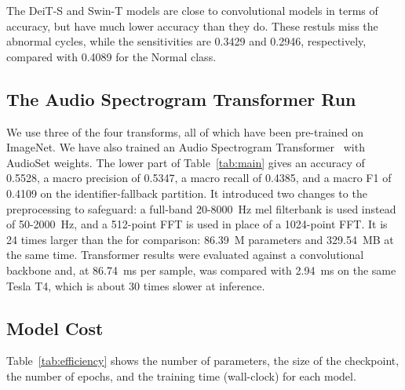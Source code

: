 \documentclass[journal,onecolumn]{IEEEtran}
\begin{document}
The DeiT-S and Swin-T models are close to convolutional models in terms of accuracy, but have much lower accuracy than they do. These restuls miss the abnormal cycles, while the sensitivities are 0.3429 and 0.2946, respectively, compared with 0.4089 for the Normal class.

\subsection{The Audio Spectrogram Transformer Run}
\label{subsec:ast}
We use three of the four transforms, all of which have been pre-trained on ImageNet. We have also trained an Audio Spectrogram Transformer~\cite{gong2021ast} with AudioSet weights.
The lower part of Table~\ref{tab:main} gives an accuracy of 0.5528, a macro precision of 0.5347, a macro recall of 0.4385, and a macro F1 of 0.4109 on the identifier-fallback partition. It introduced two changes to the preprocessing to safeguard: a full-band 20-8000~Hz mel filterbank is used instead of 50-2000~Hz, and a 512-point FFT is used in place of a 1024-point FFT. It is 24 times larger than the for comparison: 86.39~M parameters and 329.54~MB at the same time. Transformer results were evaluated against a convolutional backbone and, at 86.74~ms per sample, was compared with 2.94~ms on the same Tesla T4, which is about 30 times slower at inference.

\subsection{Model Cost}
\label{subsec:efficiency}

Table~\ref{tab:efficiency} shows the number of parameters, the size of the checkpoint, the number of epochs, and the training time (wall-clock) for each model.  
\end{document}
